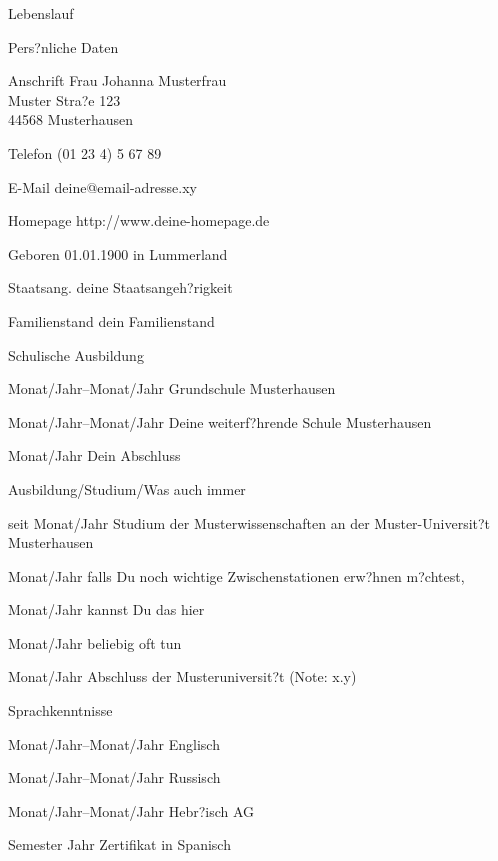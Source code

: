 \documentclass[11pt]{dinbrief}%
\begin{document}
	\begin{cv}{Lebenslauf}
		\begin{cvlist}{Pers?nliche Daten}
			\item[Anschrift] Frau Johanna Musterfrau \\
									Muster Stra?e 123\\
									44568 Musterhausen
			\item[Telefon](01 23 4) 5 67 89 
			\item[E-Mail]deine@email-adresse.xy
			\item[Homepage]http://www.deine-homepage.de
			\item[Geboren]01.01.1900 in Lummerland
			\item[Staatsang.]deine Staatsangeh?rigkeit
			\item[Familienstand]dein Familienstand
		\end{cvlist}

		\begin{cvlist}{Schulische Ausbildung}
			\item[Monat/Jahr--Monat/Jahr]Grundschule Musterhausen
			\item[Monat/Jahr--Monat/Jahr]Deine weiterf?hrende Schule Musterhausen
			\item[Monat/Jahr]Dein Abschluss
		\end{cvlist}

		\begin{cvlist}{Ausbildung/Studium/Was auch immer}
			\item[seit Monat/Jahr]Studium der Musterwissenschaften an der Muster-Universit?t Musterhausen
			\item[Monat/Jahr]falls Du noch wichtige Zwischenstationen erw?hnen m?chtest,
			\item[Monat/Jahr]kannst Du das hier
			\item[Monat/Jahr]beliebig oft tun
			\item[Monat/Jahr]Abschluss der Musteruniversit?t (Note: x.y)
		\end{cvlist}

		\begin{cvlist}{Sprachkenntnisse}
			\item[Monat/Jahr--Monat/Jahr]Englisch 
			\item[Monat/Jahr--Monat/Jahr]Russisch 
			\item[Monat/Jahr--Monat/Jahr]Hebr?isch AG 
			\item[Semester Jahr] Zertifikat in Spanisch
		\end{cvlist}


\end{cv}
\end{document}
